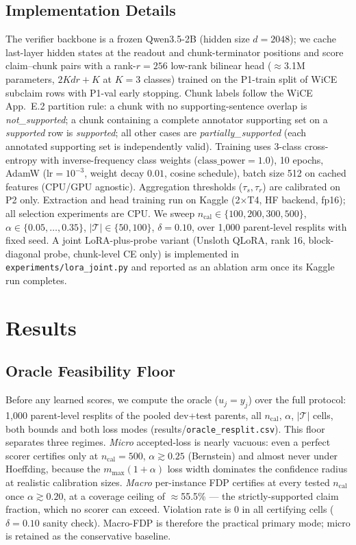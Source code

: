 \documentclass{article}
\begin{document}
\subsection{Implementation Details}
The verifier backbone is a frozen Qwen3.5-2B (hidden size $d=2048$); we
cache last-layer hidden states at the readout and chunk-terminator
positions and score claim--chunk pairs with a rank-$r{=}256$ low-rank
bilinear head ($\approx$3.1M parameters, $2Kdr{+}K$ at $K{=}3$ classes)
trained on the P1-train split of WiCE subclaim rows with P1-val early
stopping. Chunk labels follow the WiCE App.~E.2 partition rule: a chunk
with no supporting-sentence overlap is \emph{not\_supported}; a chunk
containing a complete annotator supporting set on a \emph{supported} row
is \emph{supported}; all other cases are \emph{partially\_supported}
(each annotated supporting set is independently valid). Training uses
3-class cross-entropy with inverse-frequency class weights
($\text{class\_power}{=}1.0$), 10 epochs, AdamW ($\mathrm{lr}{=}10^{-3}$,
weight decay $0.01$, cosine schedule), batch size 512 on cached features
(CPU/GPU agnostic). Aggregation thresholds ($\tau_s,\tau_r$) are
calibrated on P2 only. Extraction and head training run on Kaggle
(2$\times$T4, HF backend, fp16); all selection experiments are CPU.
We sweep $n_{\mathrm{cal}}\in\{100,200,300,500\}$,
$\alpha\in\{0.05,\dots,0.35\}$, $|\mathcal{T}|\in\{50,100\}$,
$\delta{=}0.10$, over 1{,}000 parent-level resplits with fixed seed.
A joint LoRA-plus-probe variant (Unsloth QLoRA, rank 16, block-diagonal
probe, chunk-level CE only) is implemented in
\texttt{experiments/lora\_joint.py} and reported as an ablation arm
once its Kaggle run completes.

\section{Results}
\label{sec:results}

\subsection{Oracle Feasibility Floor}
Before any learned scores, we compute the oracle ($u_j{=}y_j$) over the
full protocol: 1{,}000 parent-level resplits of the pooled dev+test
parents, all $n_{\mathrm{cal}}$, $\alpha$, $|\mathcal{T}|$ cells, both
bounds and both loss modes (results/\texttt{oracle\_resplit.csv}). This
floor separates three regimes. \emph{Micro} accepted-loss is nearly
vacuous: even a perfect scorer certifies only at
$n_{\mathrm{cal}}{=}500$, $\alpha\gtrsim0.25$ (Bernstein) and almost
never under Hoeffding, because the $m_{\max}(1{+}\alpha)$ loss width
dominates the confidence radius at realistic calibration sizes.
\emph{Macro} per-instance FDP certifies at every tested
$n_{\mathrm{cal}}$ once $\alpha\gtrsim0.20$, at a coverage ceiling of
$\approx$55.5\% --- the strictly-supported claim fraction, which no
scorer can exceed. Violation rate is 0 in all certifying cells
($\delta{=}0.10$ sanity check). Macro-FDP is therefore the practical
primary mode; micro is retained as the conservative baseline.
\end{document}
